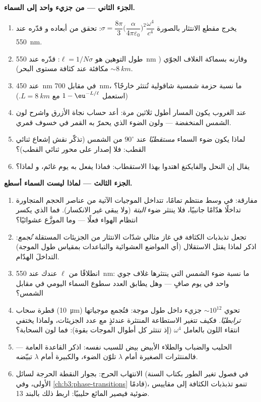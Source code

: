 \begin{problem}
\medskip\noindent\textbf{الجزء الثاني --- من جزيء واحد إلى
السماء.}
\begin{enumerate}[resume]
  \item يخرج مقطع الانتثار بالصورة $\sigma =
        \dfrac{8\pi}{3}\Big(\dfrac{\alpha}{4\pi\varepsilon_0}
        \Big)^2\dfrac{\omega^4}{c^4}$: تحقق من أبعاده و
        قدّره عند \qty{550}{nm}.
  \item طول التوهين هو $\ell = 1/N\sigma$: قدّره
        عند \qty{550}{nm} وقارنه بسماكة الغلاف
        الجوّي ($\sim\qty{8}{km}$ مكافئة عند كثافة مستوى
        البحر).
  \item عند \qty{450}{nm} في مقابل \qty{700}{nm}، ما نسبة
        حزمة شمسية شاقولية تُنتثر خارجًا؟ (استعمل $1 -
        \eu^{-L/\ell}$ مع $L = \qty{8}{km}$.)
  \item عند الغروب يكون المسار أطول ثلاثين مرة: أعد حساب
        نجاة الأزرق واشرح لون الشمس المنخفضة ---
        ولون الضوء الذي يحمرّ به القمر في خسوف
        قمري.
  \item لماذا يكون ضوء السماء \emph{مستقطبًا} عند $90^\circ$
        من الشمس (تذكّر نقش إشعاع ثنائي القطب: فلا
        إصدار على محور ثنائي القطب)؟
  \item يقال إن النحل والفايكنغ اهتدوا بهذا
        الاستقطاب: فماذا يفعل به يوم غائم، و
        لماذا؟
\end{enumerate}

\medskip\noindent\textbf{الجزء الثالث --- لماذا ليست السماء
أسطع.}
\begin{enumerate}[resume]
  \item مفارقة: في وسط منتظم تمامًا، تتداخل الموجيات
        الآتية من عناصر الحجم المتجاورة تداخلًا هدّامًا جانبيًا،
        فلا ينتثر ضوء \emph{البتة} (ولا يبقى غير الانكسار). فما
        الذي يكسر انتظام الهواء فعلًا --- وما الموزَّع عشوائيًا؟
  \item تجعل تذبذبات الكثافة في غاز مثالي شدّات الانتثار
        من الجزيئات المستقلة \emph{تُجمع}: اذكر
        لماذا يقتل الاستقلال (أي المواضع العشوائية والتباعدات
        بمقياس طول الموجة) التداخلَ الهدّام.
  \item انطلاقًا من $\ell$ عندك عند \qty{550}{nm}: ما نسبة
        ضوء الشمس التي ينتثرها غلاف جوي واحد في يوم صافٍ --- وهل
        يطابق العدد سطوع السماء اليومي في مقابل الشمس؟
  \item قطرة سحاب (\qty{10}{\micro m}) تحوي $\sim10^{12}$
        جزيء داخل طول موجة: فتُجمع موجياتها
        \emph{ترابطيًا}. فكيف تتغير الاستطاعة المنتثرة عندئذٍ
        مع عدد الجزيئات، ولماذا يختفي انتقاء اللون بالعامل
        $\omega^4$ (إذ تنتثر كل أطوال الموجات بقوة): فما لون السحابة؟
  \item الحليب والضباب والطلاء الأبيض بيض للسبب نفسه:
        اذكر القاعدة العامة --- فالمنتثرات الصغيرة أمام
        $\lambda$ تلوّن الضوء، والكبيرة أمام $\lambda$ تبيّضه.
  \item الانتهاب الحرج: بجوار النقطة الحرجة لسائل
        (في فصول تغير الطور بكتاب السنة الأولى، وفي
        \cref{ch:b3:phase-transitions} قادمًا)، تنمو تذبذبات الكثافة إلى مقاييس ضوئية
        فيصير المائع حليبيًا: اربط ذلك بالبند 13.
\end{enumerate}


\end{problem}
